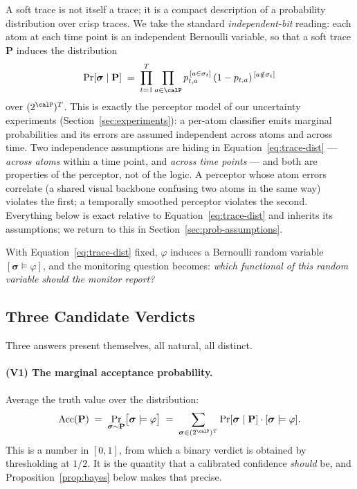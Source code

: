A soft trace is not itself a trace; it is a compact description of a probability distribution over crisp traces. We take the standard \emph{independent-bit} reading: each atom at each time point is an independent Bernoulli variable, so that a soft trace $\mathbf{P}$ induces the distribution
\begin{equation}
  \Pr[\boldsymbol{\sigma} \mid \mathbf{P}]
  \;=\;
  \prod_{t=1}^{T} \prod_{a \in \calP}
  p_{t,a}^{\,[a \in \sigma_t]}\,(1 - p_{t,a})^{\,[a \notin \sigma_t]}
  \label{eq:trace-dist}
\end{equation}
over $(2^\calP)^T$. This is exactly the perceptor model of our uncertainty experiments (Section~\ref{sec:experiments}): a per-atom classifier emits marginal probabilities and its errors are assumed independent across atoms and across time. Two independence assumptions are hiding in Equation~\eqref{eq:trace-dist} --- \emph{across atoms} within a time point, and \emph{across time points} --- and both are properties of the perceptor, not of the logic. A perceptor whose atom errors correlate (a shared visual backbone confusing two atoms in the same way) violates the first; a temporally smoothed perceptor violates the second. Everything below is exact relative to Equation~\eqref{eq:trace-dist} and inherits its assumptions; we return to this in Section~\ref{sec:prob-assumptions}.

With Equation~\eqref{eq:trace-dist} fixed, $\varphi$ induces a Bernoulli random variable $[\boldsymbol{\sigma} \models \varphi]$, and the monitoring question becomes: \emph{which functional of this random variable should the monitor report?}

\subsection{Three Candidate Verdicts}
\label{sec:prob-candidates}

Three answers present themselves, all natural, all distinct.

\paragraph{(V1) The marginal acceptance probability.} Average the truth value over the distribution:
\begin{equation}
  \mathrm{Acc}(\mathbf{P})
  \;=\;
  \Pr_{\boldsymbol{\sigma} \sim \mathbf{P}}\bigl[\boldsymbol{\sigma} \models \varphi\bigr]
  \;=\;
  \sum_{\boldsymbol{\sigma} \in (2^\calP)^T} \Pr[\boldsymbol{\sigma} \mid \mathbf{P}] \cdot [\boldsymbol{\sigma} \models \varphi].
  \label{eq:acc-marginal}
\end{equation}
This is a number in $[0,1]$, from which a binary verdict is obtained by thresholding at $1/2$. It is the quantity that a calibrated confidence \emph{should} be, and Proposition~\ref{prop:bayes} below makes that precise.

